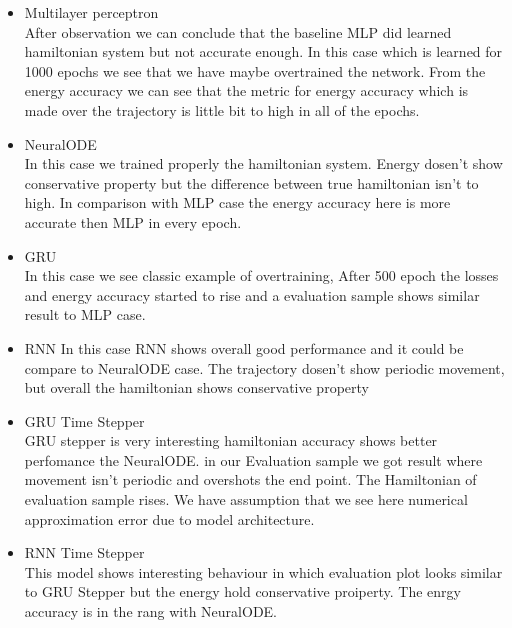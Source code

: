 \begin{itemize}
	\item Multilayer perceptron\\
	After observation we can conclude that the baseline  MLP did learned hamiltonian system but not accurate enough. In this case which is learned for 1000 epochs we see that we have maybe overtrained the network. From the energy accuracy we can see that the metric for energy accuracy which is made over the trajectory is little bit to high in all of the epochs. 


	\item NeuralODE\\
	In this case we trained properly the hamiltonian system. Energy dosen't show conservative property but the difference between true hamiltonian isn't to high. In comparison with MLP case the energy accuracy here is more accurate then MLP in every epoch. 

	\item GRU\\
	In this case we see classic example of overtraining, After 500 epoch the losses and energy accuracy started to rise and a evaluation sample shows similar result to MLP case.

	\item RNN
	In this case RNN shows overall good performance and it could be compare to NeuralODE case. The trajectory dosen't show periodic movement, but overall the hamiltonian shows conservative property

	\item GRU Time Stepper\\
	GRU stepper is very interesting hamiltonian accuracy shows better perfomance the NeuralODE. in our Evaluation sample we got result where movement isn't periodic and overshots the end point. The Hamiltonian of evaluation sample rises. We have assumption that we see here numerical approximation error due to model architecture.  


	\item RNN Time Stepper\\
	This model shows interesting behaviour in which evaluation plot looks similar to GRU Stepper but the energy hold conservative proiperty.
	The enrgy accuracy is in the rang with NeuralODE.

\end{itemize}

